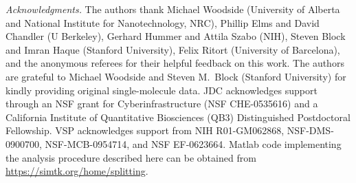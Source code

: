 \documentclass[aps,prl,twocolumn,superscriptaddress,floatfix]{revtex4-1}
\begin{document}
\begin{acknowledgments}
\noindent\emph{Acknowledgments.}
The authors thank Michael Woodside (University of Alberta and National Institute for Nanotechnology, NRC), Phillip Elms and David Chandler (U Berkeley), Gerhard Hummer and Attila Szabo (NIH), Steven Block and Imran Haque (Stanford University), Felix Ritort (University of Barcelona), and the anonymous referees for their helpful feedback on this work.
The authors are grateful to Michael Woodside and Steven M.~Block (Stanford University) for kindly providing original single-molecule data.
JDC acknowledges support through an NSF grant for Cyberinfrastructure (NSF CHE-0535616) and a California Institute of Quantitative Biosciences (QB3) Distinguished Postdoctoral Fellowship.
VSP acknowledges support from NIH R01-GM062868, NSF-DMS-0900700, NSF-MCB-0954714, and NSF EF-0623664.
Matlab code implementing the analysis procedure described here can be obtained from \url{https://simtk.org/home/splitting}.
\end{acknowledgments}


\end{document}
